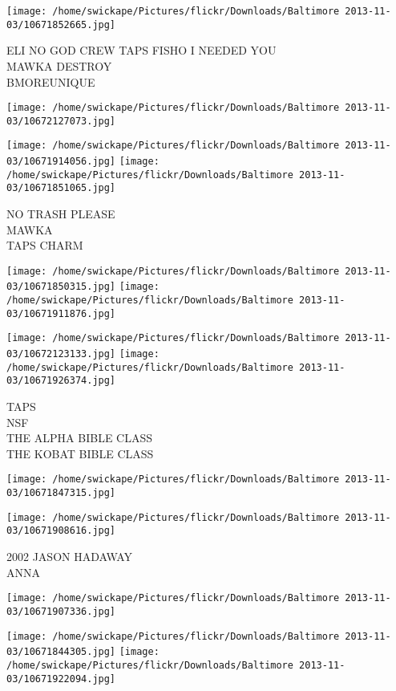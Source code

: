\documentclass[10pt,letterpaper]{article}
\begin{document}
\texttt{[image: /home/swickape/Pictures/flickr/Downloads/Baltimore 2013-11-03/10671852665.jpg]}

ELI NO GOD CREW TAPS FISHO I NEEDED YOU\\
MAWKA DESTROY\\
BMOREUNIQUE\\
\pagebreak

\texttt{[image: /home/swickape/Pictures/flickr/Downloads/Baltimore 2013-11-03/10672127073.jpg]}

\vspace{0.25in}
\texttt{[image: /home/swickape/Pictures/flickr/Downloads/Baltimore 2013-11-03/10671914056.jpg]}
\texttt{[image: /home/swickape/Pictures/flickr/Downloads/Baltimore 2013-11-03/10671851065.jpg]}

NO TRASH PLEASE\\
MAWKA\\
TAPS CHARM\\
\pagebreak

\texttt{[image: /home/swickape/Pictures/flickr/Downloads/Baltimore 2013-11-03/10671850315.jpg]}
\texttt{[image: /home/swickape/Pictures/flickr/Downloads/Baltimore 2013-11-03/10671911876.jpg]}

\texttt{[image: /home/swickape/Pictures/flickr/Downloads/Baltimore 2013-11-03/10672123133.jpg]}
\texttt{[image: /home/swickape/Pictures/flickr/Downloads/Baltimore 2013-11-03/10671926374.jpg]}

TAPS\\
NSF\\
THE ALPHA BIBLE CLASS\\
THE KOBAT BIBLE CLASS\\
\pagebreak

\texttt{[image: /home/swickape/Pictures/flickr/Downloads/Baltimore 2013-11-03/10671847315.jpg]}

\vspace{0.25in}
\texttt{[image: /home/swickape/Pictures/flickr/Downloads/Baltimore 2013-11-03/10671908616.jpg]}

2002 JASON HADAWAY\\
ANNA\\
\pagebreak

\texttt{[image: /home/swickape/Pictures/flickr/Downloads/Baltimore 2013-11-03/10671907336.jpg]}

\vspace{0.25in}
\texttt{[image: /home/swickape/Pictures/flickr/Downloads/Baltimore 2013-11-03/10671844305.jpg]}
\texttt{[image: /home/swickape/Pictures/flickr/Downloads/Baltimore 2013-11-03/10671922094.jpg]}
\end{document}
